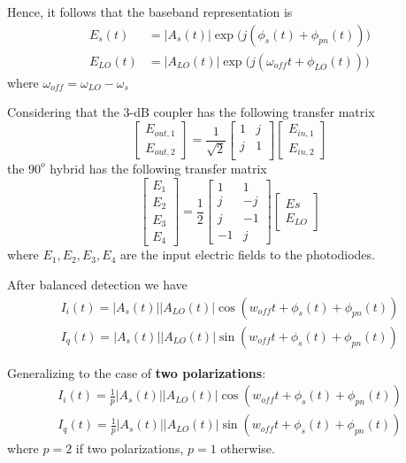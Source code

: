 \documentclass[a4paper]{article}
\begin{document}
Hence, it follows that the baseband representation is 
\begin{align}
E_s(t) &= |A_s(t)|\exp\Big(j(\phi_s(t) + \phi_{pn}(t))\Big) \\
E_{LO}(t) &= |A_{LO}(t)|\exp\Big(j(\omega_{off}t + \phi_{LO}(t))\Big)
\end{align}
where $\omega_{off} =\omega_{LO}-\omega_s$

Considering that the 3-dB coupler has the following transfer matrix
\begin{equation}
\begin{bmatrix}
E_{out, 1} \\
E_{out, 2}
\end{bmatrix} = \frac{1}{\sqrt{2}}\begin{bmatrix}
1 & j \\
j & 1 \\
\end{bmatrix}\begin{bmatrix}
E_{in, 1} \\
E_{in, 2}
\end{bmatrix}
\end{equation}
the $90^o$ hybrid has the following transfer matrix
\begin{equation}
\begin{bmatrix}
E_1\\
E_2\\
E_3\\
E_4
\end{bmatrix} = \frac{1}{2}\begin{bmatrix}
1 & 1 \\
j & -j \\
j & -1\\
-1 & j
\end{bmatrix}\begin{bmatrix}
E{s} \\
E_{LO}
\end{bmatrix}
\end{equation}
where $E_1, E_2, E_3, E_4$ are the input electric fields to the photodiodes.

After balanced detection we have
\begin{align}
I_i(t) = |A_s(t)||A_{LO}(t)|\cos(w_{off}t + \phi_s(t) + \phi_{pn}(t)) \\
I_q(t) = |A_s(t)||A_{LO}(t)|\sin(w_{off}t + \phi_s(t) + \phi_{pn}(t))
\end{align}

Generalizing to the case of \textbf{two polarizations}:
\begin{align}
I_i(t) = \frac{1}{p}|A_s(t)||A_{LO}(t)|\cos(w_{off}t + \phi_s(t) + \phi_{pn}(t)) \\
I_q(t) = \frac{1}{p}|A_s(t)||A_{LO}(t)|\sin(w_{off}t + \phi_s(t) + \phi_{pn}(t))
\end{align}
where $p = 2$ if two polarizations, $p = 1$ otherwise.
\end{document}
